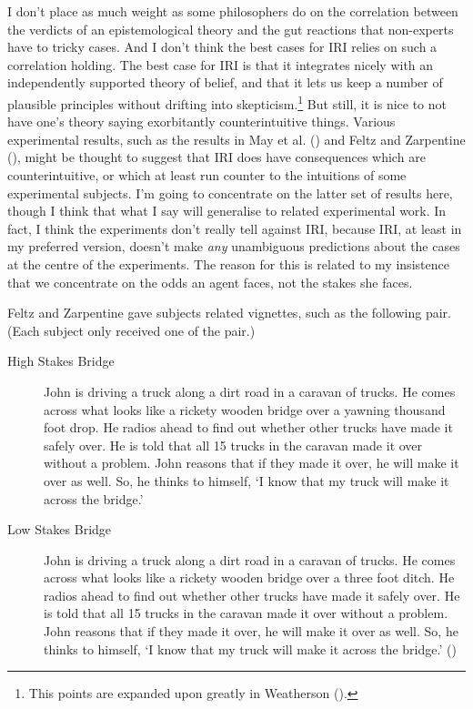 \documentclass[
  10pt,
  letterpaper,
  DIV=11,
  numbers=noendperiod,
  twoside]{scrartcl}
\begin{document}
I don't place as much weight as some philosophers do on the correlation
between the verdicts of an epistemological theory and the gut reactions
that non-experts have to tricky cases. And I don't think the best cases
for IRI relies on such a correlation holding. The best case for IRI is
that it integrates nicely with an independently supported theory of
belief, and that it lets us keep a number of plausible principles
without drifting into skepticism.\footnote{This points are expanded upon
  greatly in Weatherson ().} But
still, it is nice to not have one's theory saying exorbitantly
counterintuitive things. Various experimental results, such as the
results in May et al. () and Feltz and
Zarpentine (), might be thought
to suggest that IRI does have consequences which are counterintuitive,
or which at least run counter to the intuitions of some experimental
subjects. I'm going to concentrate on the latter set of results here,
though I think that what I say will generalise to related experimental
work. In fact, I think the experiments don't really tell against IRI,
because IRI, at least in my preferred version, doesn't make \emph{any}
unambiguous predictions about the cases at the centre of the
experiments. The reason for this is related to my insistence that we
concentrate on the odds an agent faces, not the stakes she faces.

Feltz and Zarpentine gave subjects related vignettes, such as the
following pair. (Each subject only received one of the pair.)

\begin{description}
\item[High Stakes Bridge]
John is driving a truck along a dirt road in a caravan of trucks. He
comes across what looks like a rickety wooden bridge over a yawning
thousand foot drop. He radios ahead to find out whether other trucks
have made it safely over. He is told that all 15 trucks in the caravan
made it over without a problem. John reasons that if they made it over,
he will make it over as well. So, he thinks to himself, `I know that my
truck will make it across the bridge.'
\item[Low Stakes Bridge]
John is driving a truck along a dirt road in a caravan of trucks. He
comes across what looks like a rickety wooden bridge over a three foot
ditch. He radios ahead to find out whether other trucks have made it
safely over. He is told that all 15 trucks in the caravan made it over
without a problem. John reasons that if they made it over, he will make
it over as well. So, he thinks to himself, `I know that my truck will
make it across the bridge.' ()
\end{description}
\end{document}
